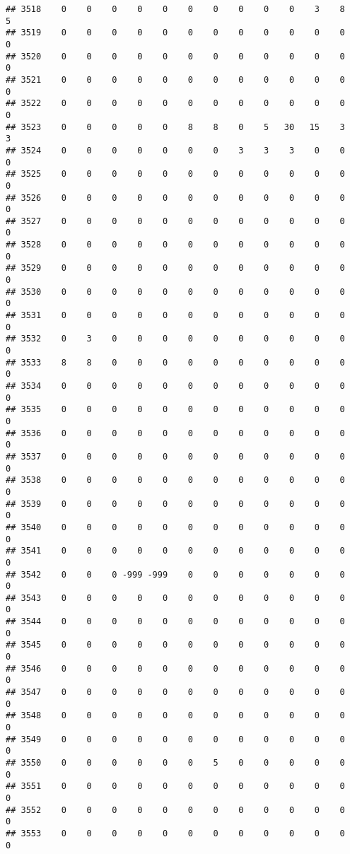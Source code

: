 \documentclass[]{article}
\begin{document}
\begin{verbatim}
## 3518    0    0    0    0    0    0    0    0    0    0    3    8    5
## 3519    0    0    0    0    0    0    0    0    0    0    0    0    0
## 3520    0    0    0    0    0    0    0    0    0    0    0    0    0
## 3521    0    0    0    0    0    0    0    0    0    0    0    0    0
## 3522    0    0    0    0    0    0    0    0    0    0    0    0    0
## 3523    0    0    0    0    0    8    8    0    5   30   15    3    3
## 3524    0    0    0    0    0    0    0    3    3    3    0    0    0
## 3525    0    0    0    0    0    0    0    0    0    0    0    0    0
## 3526    0    0    0    0    0    0    0    0    0    0    0    0    0
## 3527    0    0    0    0    0    0    0    0    0    0    0    0    0
## 3528    0    0    0    0    0    0    0    0    0    0    0    0    0
## 3529    0    0    0    0    0    0    0    0    0    0    0    0    0
## 3530    0    0    0    0    0    0    0    0    0    0    0    0    0
## 3531    0    0    0    0    0    0    0    0    0    0    0    0    0
## 3532    0    3    0    0    0    0    0    0    0    0    0    0    0
## 3533    8    8    0    0    0    0    0    0    0    0    0    0    0
## 3534    0    0    0    0    0    0    0    0    0    0    0    0    0
## 3535    0    0    0    0    0    0    0    0    0    0    0    0    0
## 3536    0    0    0    0    0    0    0    0    0    0    0    0    0
## 3537    0    0    0    0    0    0    0    0    0    0    0    0    0
## 3538    0    0    0    0    0    0    0    0    0    0    0    0    0
## 3539    0    0    0    0    0    0    0    0    0    0    0    0    0
## 3540    0    0    0    0    0    0    0    0    0    0    0    0    0
## 3541    0    0    0    0    0    0    0    0    0    0    0    0    0
## 3542    0    0    0 -999 -999    0    0    0    0    0    0    0    0
## 3543    0    0    0    0    0    0    0    0    0    0    0    0    0
## 3544    0    0    0    0    0    0    0    0    0    0    0    0    0
## 3545    0    0    0    0    0    0    0    0    0    0    0    0    0
## 3546    0    0    0    0    0    0    0    0    0    0    0    0    0
## 3547    0    0    0    0    0    0    0    0    0    0    0    0    0
## 3548    0    0    0    0    0    0    0    0    0    0    0    0    0
## 3549    0    0    0    0    0    0    0    0    0    0    0    0    0
## 3550    0    0    0    0    0    0    5    0    0    0    0    0    0
## 3551    0    0    0    0    0    0    0    0    0    0    0    0    0
## 3552    0    0    0    0    0    0    0    0    0    0    0    0    0
## 3553    0    0    0    0    0    0    0    0    0    0    0    0    0

\end{verbatim}
\end{document}
